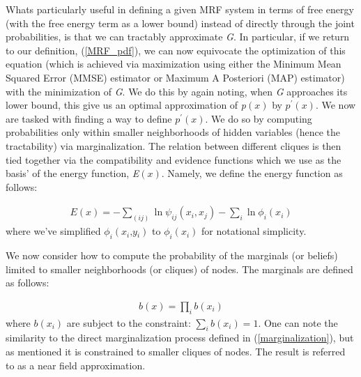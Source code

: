 \documentclass{article}
\begin{document}
Whats particularly useful in defining a given MRF system in terms of free energy (with the free energy term as a lower bound) instead of directly through the joint probabilities, is that we can tractably approximate \textit{G}. In particular, if we return to our definition, (\ref{MRF_pdf}), we can now equivocate the optimization of this equation (which is achieved via maximization using either the Minimum Mean Squared Error (MMSE) estimator or Maximum A Posteriori (MAP) estimator) with the minimization of \textit{G}. We do this by again noting, when \textit{G} approaches its lower bound, this give us an optimal approximation of \textit{p}$\left(\textit{x}\right)$ by $\textit{p}^\prime\left(\textit{x}\right)$. We now are tasked with finding a way to define $\textit{p}^\prime\left(\textit{x}\right)$. We do so by computing probabilities only within smaller neighborhoods of hidden variables (hence the tractability) via marginalization. The relation between different cliques is then tied together via the compatibility and evidence functions which we use as the basis' of the energy function, \textit{E}$\left(\textit{x}\right)$. Namely, we define the energy function as follows:

\begin{equation} \label{enegyMin}
    \begin{aligned}
        \textit{E}\left(\textit{x}\right) = -\sum_{\left(\textit{{ij}}\right)}\ln\textit{$\psi_{ij}$}\left(\textit{x$_i$}, \textit{x$_j$} \right) - \sum_\textit{i}\ln\textit{$\phi_i$}\left(\textit{x$_i$}\right)
    \end{aligned}
\end{equation} where we've simplified $\phi_i\left(\textit{x$_i$,y$_i$}\right)$ to $\phi_i\left(\textit{x$_i$}\right)$ for notational simplicity. 

We now consider how to compute the probability of the marginals (or beliefs) limited to smaller neighborhoods (or cliques) of nodes. The marginals are defined as follows: 

\begin{equation} \label{nearFieldApprox}
    \begin{aligned}
        \textit{b}\left(\textit{x}\right) = \prod_\textit{i}\textit{b}\left(\textit{x$_i$}\right)
     \end{aligned}
\end{equation} where $\textit{b}\left(\textit{x$_i$}\right)$ are subject to the constraint: $\sum_\textit{i}\textit{b}\left(\textit{x$_i$}\right) = 1$. One can note the similarity to the direct marginalization process defined in (\ref{marginalization}), but as mentioned it is constrained to smaller cliques of nodes. The result is referred to as a near field approximation.
\end{document}
